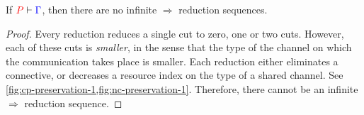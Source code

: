 \begin{theorem}[Termination]\label{thm:nc-termination}
  If $\seq[{ P }]{ \Gamma }$, then there are no infinite $\Longrightarrow$
  reduction sequences.
\end{theorem}
\begin{proof}
  Every reduction reduces a single cut to zero, one or two cuts.
  However, each of these cuts is \emph{smaller}, in the sense that the type of
  the channel on which the communication takes place is smaller.
  Each reduction either eliminates a connective, or decreases a resource index
  on the type of a shared channel.
  See \cref{fig:cp-preservation-1,fig:nc-preservation-1}.
  Therefore, there cannot be an infinite $\Longrightarrow$ reduction sequence.
\end{proof}
